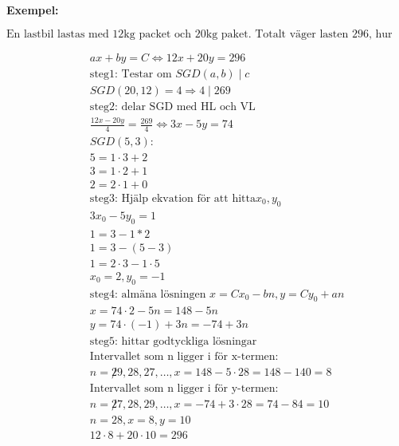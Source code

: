 \textbf{Exempel:}\par
\begin{equation}
  \text{En lastbil lastas med 12kg packet och 20kg paket. Totalt väger lasten 296, hur många av varge packet?}
\end{equation}

\begin{align*}
  &\quad  ax + by = C \Leftrightarrow 12x + 20y = 296 \\
  &\quad  \text{steg1: Testar om } SGD(a,b) \mid c \\
  &\quad  SGD(20,12) = 4 \Rightarrow 4 \mid 269 \\
  &\quad  \text{steg2: delar SGD med HL och VL} \\
  &\quad  \frac{12x - 20y}{4} = \frac{269}{4} \Leftrightarrow 3x - 5y = 74 \\
  &\quad  SGD(5,3): \\
  &\quad  5 = 1 \cdot 3 + 2 \\
  &\quad  3 = 1 \cdot 2 + 1 \\
  &\quad  2 = 2 \cdot 1 + 0 \\
  &\quad  \text{steg3: Hjälp ekvation för att hitta} x_0, y_0 \\
  &\quad  3x_0 - 5y_0 = 1 \\
  &\quad  1 = 3 - 1 * 2 \\
  &\quad  1 = 3 - (5 - 3) \\
  &\quad  1 = 2 \cdot 3 - 1 \cdot 5 \\
  &\quad  x_0 = 2, y_0 = -1 \\
  &\quad  \text{steg4: almäna lösningen } x = Cx_0 - bn, y = Cy_0 + an \\
  &\quad  x = 74 \cdot 2 - 5n = 148 - 5n \\
  &\quad  y = 74 \cdot (-1) + 3n = -74 + 3n \\
  &\quad  \text{steg5: hittar godtyckliga lösningar} \\
  &\quad  \text{Intervallet som n ligger i för x-termen:} \\
  &\quad  n = {\not 29, 28, 27, \ldots }, x = 148 - 5 \cdot 28 = 148 - 140 = 8 \\ 
  &\quad  \text{Intervallet som n ligger i för y-termen:} \\
  &\quad  n = {\not 27, 28, 29, \ldots }, x = -74 + 3 \cdot 28 = 74 - 84 = 10 \\
  &\quad  n = 28, x=8, y=10 \\
  &\quad  12 \cdot 8 + 20 \cdot 10 = 296 \\
\end{align*}


